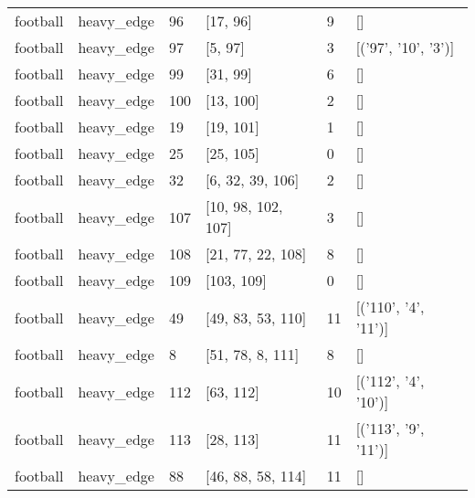 \begin{tabular}{llllll}
football & heavy_edge & 96 & [17, 96] & 9 & [] \\
football & heavy_edge & 97 & [5, 97] & 3 & [('97', '10', '3')] \\
football & heavy_edge & 99 & [31, 99] & 6 & [] \\
football & heavy_edge & 100 & [13, 100] & 2 & [] \\
football & heavy_edge & 19 & [19, 101] & 1 & [] \\
football & heavy_edge & 25 & [25, 105] & 0 & [] \\
football & heavy_edge & 32 & [6, 32, 39, 106] & 2 & [] \\
football & heavy_edge & 107 & [10, 98, 102, 107] & 3 & [] \\
football & heavy_edge & 108 & [21, 77, 22, 108] & 8 & [] \\
football & heavy_edge & 109 & [103, 109] & 0 & [] \\
football & heavy_edge & 49 & [49, 83, 53, 110] & 11 & [('110', '4', '11')] \\
football & heavy_edge & 8 & [51, 78, 8, 111] & 8 & [] \\
football & heavy_edge & 112 & [63, 112] & 10 & [('112', '4', '10')] \\
football & heavy_edge & 113 & [28, 113] & 11 & [('113', '9', '11')] \\
football & heavy_edge & 88 & [46, 88, 58, 114] & 11 & [] \\
\bottomrule
\end{tabular}


